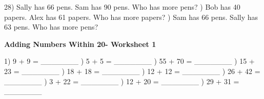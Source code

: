 \documentclass{article}%
\begin{document}
28) Sally has 66 pens. Sam has 90 pens. Who has more pens?%
\newline%
\newline%
) Bob has 40 papers. Alex has 61 papers. Who has more papers?%
\newline%
\newline%
) Sam has 66 pens. Sally has 63 pens. Who has more pens?%
\newline%
\newline%
\newline%
\pagebreak%
\large%
\begin{center}%
\textbf{Adding Numbers Within 20- Worksheet 1}%
\newline%
\newline%
\newline%
\end{center} \normalsize%
1) 9 + 9 = \_\_\_\_\_\_\_%
\newline%
\newline%
) 5 + 5 = \_\_\_\_\_\_\_%
\newline%
\newline%
) 55 + 70 = \_\_\_\_\_\_\_%
\newline%
\newline%
) 15 + 23 = \_\_\_\_\_\_\_%
\newline%
\newline%
) 18 + 18 = \_\_\_\_\_\_\_%
\newline%
\newline%
) 12 + 12 = \_\_\_\_\_\_\_%
\newline%
\newline%
) 26 + 42 = \_\_\_\_\_\_\_%
\newline%
\newline%
) 3 + 22 = \_\_\_\_\_\_\_%
\newline%
\newline%
) 12 + 20 = \_\_\_\_\_\_\_%
\newline%
\newline%
) 29 + 31 = \_\_\_\_\_\_\_%
\end{document}
